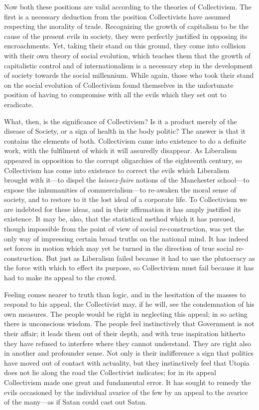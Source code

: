 \documentclass{book}
\begin{document}
Now both these positions are valid according to the theories of Collectivism. The first is a necessary deduction from the position Collectivists have assumed respecting the morality of trade. Recognizing the growth of capitalism to be the cause of the present evils in society, they were perfectly justified in opposing its encroachments. Yet, taking their stand on this ground, they come into collision with their own theory of social evolution, which teaches them that the growth of capitalistic control and of internationalism is a necessary step in the development of society towards the social millennium. While again, those who took their stand on the social evolution of Collectivism found themselves in the unfortunate position of having to compromise with all the evils which they set out to eradicate.

What, then, is the significance of Collectivism? Is it a product merely of the disease of Society, or a sign of health in the body politic? The answer is that it contains the elements of both. Collectivism came into existence to do a definite work, with the fulfilment of which it will assuredly disappear. As Liberalism appeared in opposition to the corrupt oligarchies of the eighteenth century, so Collectivism has come into existence to correct the evils which Liberalism brought with it—to dispel the \emph{laissez-faire} notions of the Manchester school—to expose the inhumanities of commercialism—to re-awaken the moral sense of society, and to restore to it the lost ideal of a corporate life. To Collectivism we are indebted for these ideas, and in their affirmation it has amply justified its existence. It may be, also, that the statistical method which it has pursued, though impossible from the point of view of social re-construction, was yet the only way of impressing certain broad truths on the national mind. It has indeed set forces in motion which may yet be turned in the direction of true social re-construction. But just as Liberalism failed because it had to use the plutocracy as the force with which to effect its purpose, so Collectivism must fail because it has had to make its appeal to the crowd.

Feeling comes nearer to truth than logic, and in the hesitation of the masses to respond to his appeal, the Collectivist may, if he will, see the condemnation of his own measures. The people would be right in neglecting this appeal; in so acting there is unconscious wisdom. The people feel instinctively that Government is not their affair; it leads them out of their depth, and with true inspiration hitherto they have refused to interfere where they cannot understand. They are right also in another and profounder sense. Not only is their indifference a sign that politics have moved out of contact with actuality, but they instinctively feel that Utopia does not lie along the road the Collectivist indicates; for in its appeal Collectivism made one great and fundamental error. It has sought to remedy the evils occasioned by the individual avarice of the few by an appeal to the avarice of the many—as if Satan could cast out Satan.
\end{document}
